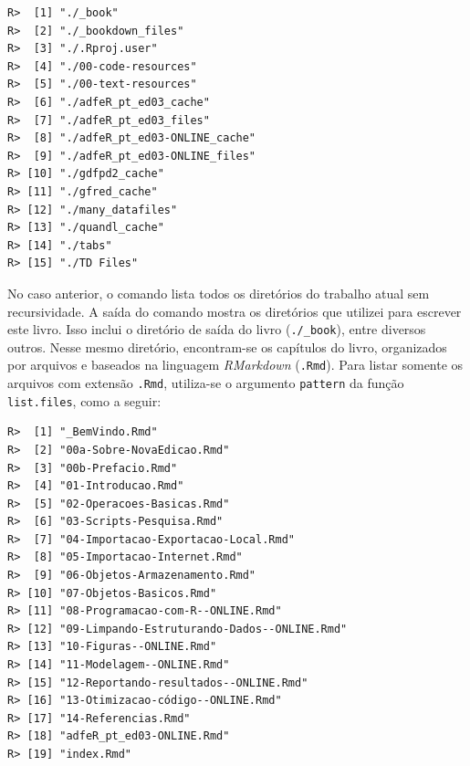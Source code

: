 \documentclass[
  11pt,
]{book}
\newenvironment{Shaded}{\begin{snugshade}}{\end{snugshade}}
\newcommand{\AttributeTok}[1]{\textcolor[rgb]{0.61,0.61,0.61}{#1}}
\newcommand{\FunctionTok}[1]{\textcolor[rgb]{0,0,0}{#1}}
\newcommand{\NormalTok}[1]{#1}
\newcommand{\StringTok}[1]{\textcolor[rgb]{0.5,0.5,0.5}{#1}}
\begin{document}
\begin{verbatim}
R>  [1] "./_book"                     
R>  [2] "./_bookdown_files"           
R>  [3] "./.Rproj.user"               
R>  [4] "./00-code-resources"         
R>  [5] "./00-text-resources"         
R>  [6] "./adfeR_pt_ed03_cache"       
R>  [7] "./adfeR_pt_ed03_files"       
R>  [8] "./adfeR_pt_ed03-ONLINE_cache"
R>  [9] "./adfeR_pt_ed03-ONLINE_files"
R> [10] "./gdfpd2_cache"              
R> [11] "./gfred_cache"               
R> [12] "./many_datafiles"            
R> [13] "./quandl_cache"              
R> [14] "./tabs"                      
R> [15] "./TD Files"
\end{verbatim}

No caso anterior, o comando lista todos os diretórios do trabalho atual sem recursividade. A saída do comando mostra os diretórios que utilizei para escrever este livro. Isso inclui o diretório de saída do livro (\texttt{./\_book}), entre diversos outros. Nesse mesmo diretório, encontram-se os capítulos do livro, organizados por arquivos e baseados na linguagem \emph{RMarkdown} (\texttt{.Rmd}). Para listar somente os arquivos com extensão \texttt{.Rmd}, utiliza-se o argumento \texttt{pattern} da função \texttt{list.files}, como a seguir:

\begin{Shaded}
\end{Shaded}

\begin{verbatim}
R>  [1] "_BemVindo.Rmd"                             
R>  [2] "00a-Sobre-NovaEdicao.Rmd"                  
R>  [3] "00b-Prefacio.Rmd"                          
R>  [4] "01-Introducao.Rmd"                         
R>  [5] "02-Operacoes-Basicas.Rmd"                  
R>  [6] "03-Scripts-Pesquisa.Rmd"                   
R>  [7] "04-Importacao-Exportacao-Local.Rmd"        
R>  [8] "05-Importacao-Internet.Rmd"                
R>  [9] "06-Objetos-Armazenamento.Rmd"              
R> [10] "07-Objetos-Basicos.Rmd"                    
R> [11] "08-Programacao-com-R--ONLINE.Rmd"          
R> [12] "09-Limpando-Estruturando-Dados--ONLINE.Rmd"
R> [13] "10-Figuras--ONLINE.Rmd"                    
R> [14] "11-Modelagem--ONLINE.Rmd"                  
R> [15] "12-Reportando-resultados--ONLINE.Rmd"      
R> [16] "13-Otimizacao-código--ONLINE.Rmd"          
R> [17] "14-Referencias.Rmd"                        
R> [18] "adfeR_pt_ed03-ONLINE.Rmd"                  
R> [19] "index.Rmd"
\end{verbatim}
\end{document}
